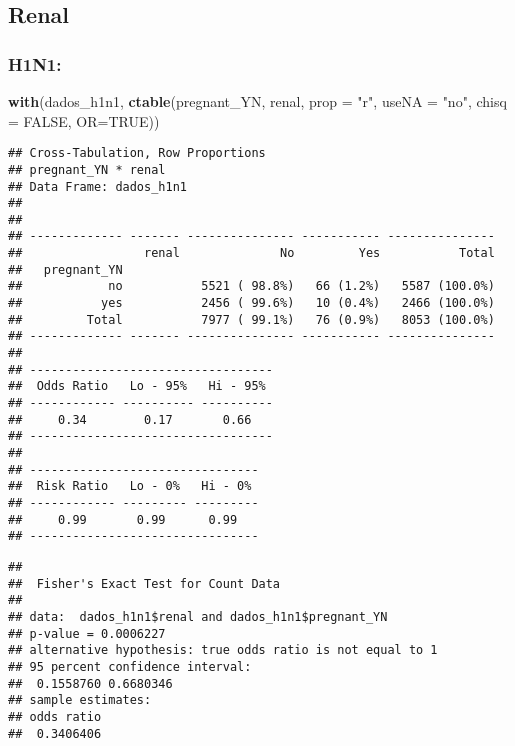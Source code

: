 \documentclass[
]{article}
\newenvironment{Shaded}{\begin{snugshade}}{\end{snugshade}}
\newcommand{\DataTypeTok}[1]{\textcolor[rgb]{0.13,0.29,0.53}{#1}}
\newcommand{\KeywordTok}[1]{\textcolor[rgb]{0.13,0.29,0.53}{\textbf{#1}}}
\newcommand{\NormalTok}[1]{#1}
\newcommand{\OperatorTok}[1]{\textcolor[rgb]{0.81,0.36,0.00}{\textbf{#1}}}
\newcommand{\OtherTok}[1]{\textcolor[rgb]{0.56,0.35,0.01}{#1}}
\newcommand{\StringTok}[1]{\textcolor[rgb]{0.31,0.60,0.02}{#1}}
\begin{document}
\hypertarget{renal}{%
\subsection{Renal}\label{renal}}

\hypertarget{h1n1-7}{%
\subsubsection{H1N1:}\label{h1n1-7}}

\begin{Shaded}
\begin{Highlighting}[]
\KeywordTok{with}\NormalTok{(dados_h1n1, }\KeywordTok{ctable}\NormalTok{(pregnant_YN, renal, }\DataTypeTok{prop =} \StringTok{"r"}\NormalTok{, }\DataTypeTok{useNA =} \StringTok{"no"}\NormalTok{, }\DataTypeTok{chisq =} \OtherTok{FALSE}\NormalTok{, }\DataTypeTok{OR=}\OtherTok{TRUE}\NormalTok{))}
\end{Highlighting}
\end{Shaded}

\begin{verbatim}
## Cross-Tabulation, Row Proportions  
## pregnant_YN * renal  
## Data Frame: dados_h1n1  
## 
## 
## ------------- ------- --------------- ----------- ---------------
##                 renal              No         Yes           Total
##   pregnant_YN                                                    
##            no           5521 ( 98.8%)   66 (1.2%)   5587 (100.0%)
##           yes           2456 ( 99.6%)   10 (0.4%)   2466 (100.0%)
##         Total           7977 ( 99.1%)   76 (0.9%)   8053 (100.0%)
## ------------- ------- --------------- ----------- ---------------
## 
## ----------------------------------
##  Odds Ratio   Lo - 95%   Hi - 95% 
## ------------ ---------- ----------
##     0.34        0.17       0.66   
## ----------------------------------
## 
## --------------------------------
##  Risk Ratio   Lo - 0%   Hi - 0% 
## ------------ --------- ---------
##     0.99       0.99      0.99   
## --------------------------------
\end{verbatim}

\begin{Shaded}
\end{Shaded}

\begin{verbatim}
## 
##  Fisher's Exact Test for Count Data
## 
## data:  dados_h1n1$renal and dados_h1n1$pregnant_YN
## p-value = 0.0006227
## alternative hypothesis: true odds ratio is not equal to 1
## 95 percent confidence interval:
##  0.1558760 0.6680346
## sample estimates:
## odds ratio 
##  0.3406406
\end{verbatim}
\end{document}
